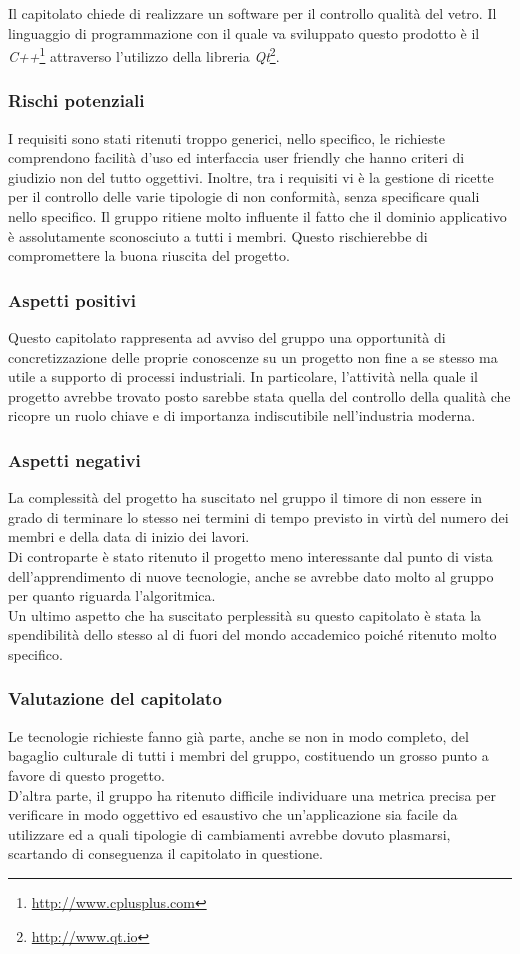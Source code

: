 Il capitolato chiede di realizzare un software per il controllo qualità del vetro. Il linguaggio di programmazione con il quale va sviluppato questo prodotto è il \textit{C++}\footnote{\url{http://www.cplusplus.com}} attraverso l'utilizzo della libreria \textit{Qt}\footnote{\url{http://www.qt.io}}.
\subsubsection{Rischi potenziali}
I requisiti sono stati ritenuti troppo generici, nello specifico, le richieste comprendono facilità d'uso ed interfaccia user friendly che hanno criteri di giudizio non del tutto oggettivi.
Inoltre, tra i requisiti vi è la gestione di ricette per il controllo delle varie tipologie di non conformità, senza specificare quali nello specifico.
Il gruppo \GRUPPO{} ritiene molto influente il fatto che il dominio applicativo è assolutamente sconosciuto a tutti i membri. Questo rischierebbe di compromettere la buona riuscita del progetto.
\subsubsection{Aspetti positivi}
Questo capitolato rappresenta ad avviso del gruppo una opportunità di concretizzazione delle proprie conoscenze su un progetto non fine a se stesso ma utile a supporto di processi industriali. In particolare, l'attività nella quale il progetto avrebbe trovato posto sarebbe stata quella del controllo della qualità che ricopre un ruolo chiave e di importanza indiscutibile nell'industria moderna.
\subsubsection{Aspetti negativi}
La complessità del progetto ha suscitato nel gruppo il timore di non essere in grado di terminare lo stesso nei termini di tempo previsto in virtù del numero dei membri e della data di inizio dei lavori. \\
Di controparte è stato ritenuto il progetto meno interessante dal punto di vista dell'apprendimento di nuove tecnologie, anche se avrebbe dato molto al gruppo per quanto riguarda l'algoritmica.\\
Un ultimo aspetto che ha suscitato perplessità su questo capitolato è stata la spendibilità dello stesso al di fuori del mondo accademico poiché ritenuto molto specifico.
\subsubsection{Valutazione del capitolato}
Le tecnologie richieste fanno già parte, anche se non in modo completo, del bagaglio culturale di tutti i membri del gruppo, costituendo un grosso punto a favore di questo progetto. \\
D'altra parte, il gruppo ha ritenuto difficile individuare una metrica precisa per verificare in modo oggettivo ed esaustivo che un'applicazione sia facile da utilizzare ed a quali tipologie di cambiamenti avrebbe dovuto plasmarsi, scartando di conseguenza il capitolato in questione.
